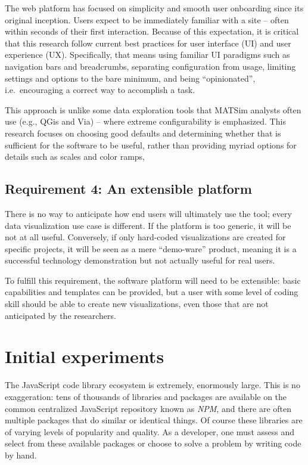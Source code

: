 The web platform has focused on simplicity and smooth user onboarding since its original inception. Users expect to be immediately familiar with a site -- often within seconds of their first interaction. Because of this expectation, it is critical that this research follow current best practices for user interface (UI) and user experience (UX). Specifically, that means using familiar UI paradigms such as navigation bars and breadcrumbs, separating configuration from usage, limiting settings and options to the bare minimum, and being ``opinionated'', i.e.~encouraging a correct way to accomplish a task.

This approach is unlike some data exploration tools that MATSim analysts often use (e.g., QGis and Via) -- where extreme configurability is emphasized. This research focuses on choosing good defaults and determining whether that is sufficient for the software to be useful, rather than providing myriad options for details such as scales and color ramps,

\hypertarget{requirement-4-an-extensible-platform}{%
\subsection{Requirement 4: An extensible platform}\label{requirement-4-an-extensible-platform}}

There is no way to anticipate how end users will ultimately use the tool; every data visualization use case is different. If the platform is too generic, it will be not at all useful. Conversely, if only hard-coded visualizations are created for specific projects, it will be seen as a mere ``demo-ware'' product, meaning it is a successful technology demonstration but not actually useful for real users.

To fulfill this requirement, the software platform will need to be extensible: basic capabilities and templates can be provided, but a user with some level of coding skill should be able to create new visualizations, even those that are not anticipated by the researchers.

\hypertarget{mathub-initial-experiments}{%
\section{Initial experiments}\label{initial-experiments}}

The JavaScript code library ecosystem is extremely, enormously large. This is no exaggeration: tens of thousands of libraries and packages are available on the common centralized JavaScript repository known as \emph{NPM}, and there are often multiple packages that do similar or identical things. Of course these libraries are of varying levels of popularity and quality. As a developer, one must assess and select from these available packages or choose to solve a problem by writing code by hand.


